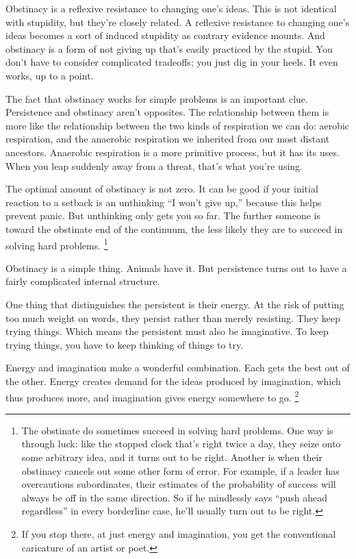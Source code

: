 \documentclass[12pt]{book}
\begin{document}
Obstinacy is a reflexive resistance to changing one's ideas. This is not
identical with stupidity, but they're closely related. A reflexive
resistance to changing one's ideas becomes a sort of induced stupidity
as contrary evidence mounts. And obstinacy is a form of not giving up
that's easily practiced by the stupid. You don't have to consider
complicated tradeoffs; you just dig in your heels. It even works, up to
a point.

The fact that obstinacy works for simple problems is an important clue.
Persistence and obstinacy aren't opposites. The relationship between
them is more like the relationship between the two kinds of respiration
we can do: aerobic respiration, and the anaerobic respiration we
inherited from our most distant ancestors. Anaerobic respiration is a
more primitive process, but it has its uses. When you leap suddenly away
from a threat, that's what you're using.

The optimal amount of obstinacy is not zero. It can be good if your
initial reaction to a setback is an unthinking ``I won't give up,''
because this helps prevent panic. But unthinking only gets you so far.
The further someone is toward the obstinate end of the continuum, the
less likely they are to succeed in solving hard problems.
\footnote{The obstinate do sometimes succeed in solving hard problems. One
way is through luck: like the stopped clock that's right twice a day,
they seize onto some arbitrary idea, and it turns out to be right.
Another is when their obstinacy cancels out some other form of error.
For example, if a leader has overcautious subordinates, their estimates
of the probability of success will always be off in the same direction.
So if he mindlessly says ``push ahead regardless'' in every borderline
case, he'll usually turn out to be right.}

Obstinacy is a simple thing. Animals have it. But persistence turns out
to have a fairly complicated internal structure.

One thing that distinguishes the persistent is their energy. At the risk
of putting too much weight on words, they persist rather than merely
resisting. They keep trying things. Which means the persistent must also
be imaginative. To keep trying things, you have to keep thinking of
things to try.

Energy and imagination make a wonderful combination. Each gets the best
out of the other. Energy creates demand for the ideas produced by
imagination, which thus produces more, and imagination gives energy
somewhere to go. \footnote{If you stop there, at just energy and imagination, you get the
conventional caricature of an artist or poet.}
\end{document}

